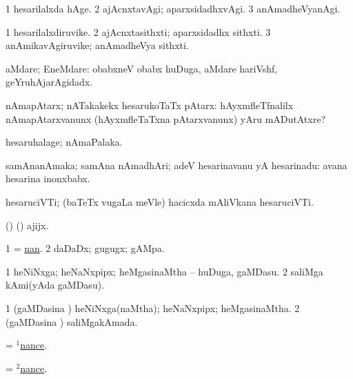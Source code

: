 \bentry
{}
\gl{\kirxvi}
\bmng
\bnum
\num{1} hesarilalxda hAge. 
\num{2} ajAcnxtavAgi; aparxsidadhxvAgi. 
\num{3} anAmadheVyanAgi. 
\enum
\emng
\eentry

\bentry
{}
\gl{\nA}
\bmng
\bnum
\num{1} hesarilalxdiruvike. 
\num{2} ajAcnxtasithxti; aparxsidadhx sithxti. 
\num{3} anAmikavAgiruvike; anAmadheVya sithxti. 
\enum
\emng
\eentry

\bentry
{}
\gl{\kirxvi}
\bmng
aMdare; EneMdare:  obabxneV obabx huDuga, aMdare hariVshf, geYruhAjarAgidadx. 
\emng
\eentry

\bentry
{}
\gl{\nA}
\bmng
nAmapAtarx; nATakakekx hesarukoTaTx pAtarx:  hAyxmfleTfnalilx nAmapAtarxvanunx (hAyxmfleTaTxna pAtarxvanunx) yAru mADutAtxre? 
\emng
\eentry

\bentry
{}
\gl{\nA}
\bmng
hesaruhalage; nAmaPalaka. 
\emng
\eentry

\bentry
{}
\gl{\nA}
\bmng
samAnanAmaka; samAna nAmadhAri; adeV hesarinavanu yA hesarinadu:  avana hesarina inonxbabx. 
\emng
\eentry

\bentry
{}
\gl{\nA}
\bmng
hesaruciVTi; (baTeTx \mo vugaLa meVle) hacicxda mAliVkana hesaruciVTi. 
\emng
\eentry

\bentry
{}
\gl{\nA}
\bmng
(\birx) (\AmA) ajijx. 
\emng
\eentry

\bentry
{}
\gl{\nA}
\bmng
\bnum
\num{1} = \hyperlink{nan}{nan}.
\num{2} daDaDx; gugugx; gAMpa. 
\enum
\emng
\eentry

\bentry
{}
\gl{\nA}
\bmng
\bnum
\num{1} heNiNxga; heNaNxpipx; heMgasinaMtha -- huDuga, gaMDasu. 
\num{2} saliMga kAmi(yAda gaMDasu). 
\enum
\emng
\eentry

\bentry
{}
\gl{\gu}
\bmng
\bnum
\num{1} (gaMDasina \vi) heNiNxga(naMtha); heNaNxpipx; heMgasinaMtha. 
\num{2} (gaMDasina \vi) saliMgakAmada. 
\enum
\emng
\eentry

\bentry
{}
\gl{\nA}
\bmng
= \hyperlink{nance(1)}{$^1$nance}. 
\emng
\eentry

\bentry
{}
\gl{\gu}
\bmng
= \hyperlink{nance(2)}{$^2$nance}.
\emng
\eentry

